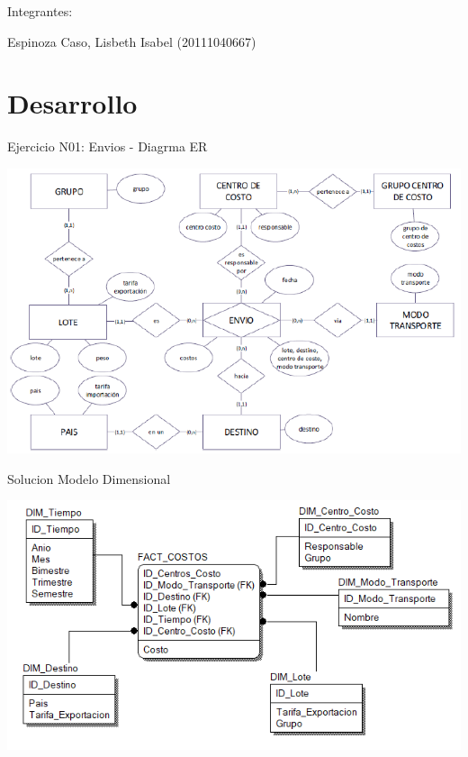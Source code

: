 \documentclass[12pt,letterpaper]{article}
\begin{document}
\begin{titlepage}
\begin{center}
\vspace*{0.2in}
\vspace*{0.1in}
\begin{large}
Integrantes: \\
\begin{flushleft}
Espinoza Caso, Lisbeth Isabel 		\hfill	(20111040667) \\

\end{flushleft}
\end{large}
\end{center}

\end{titlepage}

 \newpage

\section{Desarrollo} 

Ejercicio N01:  Envios - Diagrma ER

\begin{center}
\includegraphics[width=17cm]{IMG/er1.png} 
\end{center}

Solucion
Modelo Dimensional
\begin{center}
\includegraphics[width=17cm]{IMG/ejer1.png} 
\end{center}
 \newpage
\end{document}
